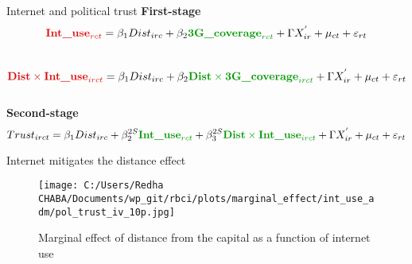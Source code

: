 \documentclass[aspectratio=169,xcolor=dvipsnames]{beamer}
\begin{document}
    \begin{frame}{Internet and political trust}
    \centering \textbf{First-stage}
\vspace{0.5em}
    \begin{equation}
    \fontsize{10}{11}\selectfont
    \textcolor[RGB]{220, 10, 10}{\textbf{Int\_use}_{rct}} = \beta_{1} Dist_{irc} + \beta_{2} \textcolor[rgb]{0.0,0.6,0.0}{\textbf{3G\_coverage}_{rct}} + \Gamma X^{'}_{ir} + \mu_{ct}+ \varepsilon_{rt}
    \end{equation}
\\
\begin{equation}
    \fontsize{10}{11}\selectfont
    \textcolor[RGB]{220, 10, 10}{\textbf{Dist} \times \textbf{Int\_use}_{irct}} = \beta_{1} Dist_{irc} + \beta_{2} \textcolor[rgb]{0.0,0.6,0.0}{\textbf{Dist} \times \textbf{3G\_coverage}_{irct}} + \Gamma X^{'}_{ir} + \mu_{ct}+ \varepsilon_{rt}
    \end{equation}
\\
    \centering \textbf{Second-stage}
    \vspace{0.5em}
    \begin{equation}
    \fontsize{10}{11}\selectfont
    Trust_{irct} = \beta_{1} Dist_{irc} + \beta_{2}^{2S} \textcolor[rgb]{0.0,0.6,0.0}{\textbf{Int\_use}_{rct}} + \beta_{3}^{2S} \textcolor[rgb]{0.0,0.6,0.0}{\textbf{Dist} \times \textbf{Int\_use}_{irct}} + \Gamma X^{'}_{ir} + \mu_{ct}+ \varepsilon_{rt}
    \end{equation}

\end{frame}


\begin{frame}{Internet mitigates the distance effect}

\begin{figure}
    \texttt{[image: C:/Users/Redha CHABA/Documents/wp\_git/rbci/plots/marginal\_effect/int\_use\_adm/pol\_trust\_iv\_10p.jpg]}
    \caption{Marginal effect of distance from the capital as a function of internet use}
\end{figure}

\end{frame}
\end{document}
